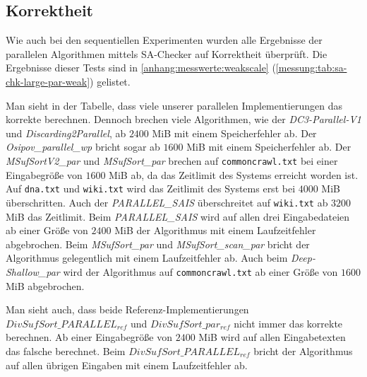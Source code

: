 \subsection{\sa Korrektheit}

Wie auch bei den sequentiellen Experimenten wurden alle Ergebnisse der parallelen Algorithmen mittels SA-Checker auf Korrektheit überprüft.
Die Ergebnisse dieser Tests sind in \cref{anhang:messwerte:weakscale} (\cref{messung:tab:sa-chk-large-par-weak}) gelistet.

Man sieht in der Tabelle, dass viele unserer parallelen Implementierungen das korrekte \sa berechnen. Dennoch brechen viele Algorithmen, wie der \emph{DC3-Parallel-V1} und \emph{Discarding2Parallel}, ab $2400$ MiB mit einem Speicherfehler ab. Der \emph{Osipov\_parallel\_wp} bricht sogar ab $1600$ MiB mit einem Speicherfehler ab. Der \emph{MSufSortV2\_par} und \emph{MSufSort\_par} brechen auf \texttt{commoncrawl.txt} bei einer Eingabegröße von $1600$ MiB ab, da das Zeitlimit des Systems erreicht worden ist. Auf \texttt{dna.txt} und \texttt{wiki.txt} wird das Zeitlimit des Systems erst bei $4000$ MiB überschritten. Auch der \emph{PARALLEL\_SAIS} überschreitet auf \texttt{wiki.txt} ab $3200$ MiB das Zeitlimit. Beim \emph{PARALLEL\_SAIS} wird auf allen drei Eingabedateien ab einer Größe von $2400$ MiB der Algorithmus mit einem Laufzeitfehler abgebrochen. Beim \emph{MSufSort\_par} und \emph{MSufSort\_scan\_par} bricht der Algorithmus gelegentlich mit einem Laufzeitfehler ab. Auch beim \emph{Deep-Shallow\_par} wird der Algorithmus auf \texttt{commoncrawl.txt} ab einer Größe von $1600$ MiB abgebrochen. \par
Man sieht auch, dass beide Referenz-Implementierungen \emph{$DivSufSort\_PARALLEL_{ref}$} und \emph{$DivSufSort\_par_{ref}$} nicht immer das korrekte \sa berechnen. Ab einer Eingabegröße von $2400$ MiB wird auf allen Eingabetexten das falsche \sa berechnet. Beim \emph{$DivSufSort\_PARALLEL_{ref}$} bricht der Algorithmus auf allen übrigen Eingaben mit einem Laufzeitfehler ab.
